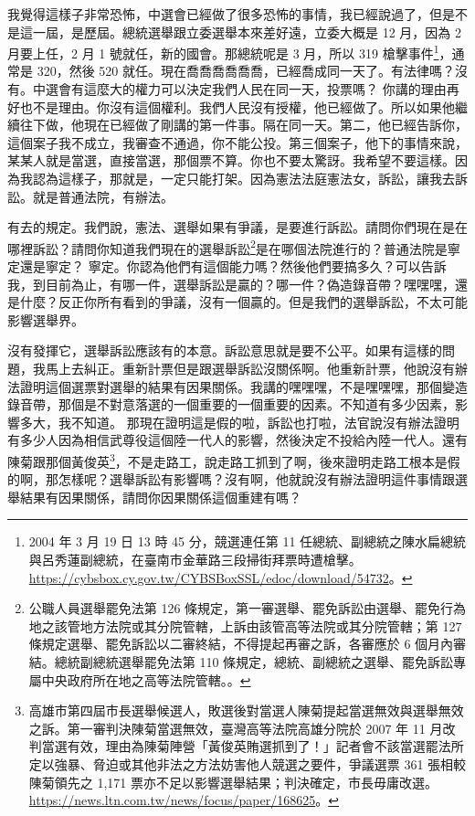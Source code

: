 \hypertarget{w05:cue:345}{}我覺得這樣子非常恐怖，中選會已經做了很多恐怖的事情，我已經說過了，但是不是這一屆，是歷屆。總統選舉跟立委選舉本來差好遠，立委大概是 12 月，因為 2 月要上任，2 月 1 號就任，新的國會。那總統呢是 3 月，所以 319 槍擊事件\footnote{2004 年 3 月 19 日 13 時 45 分，競選連任第 11 任總統、副總統之陳水扁總統與呂秀蓮副總統，在臺南市金華路三段掃街拜票時遭槍擊。\url{https://cybsbox.cy.gov.tw/CYBSBoxSSL/edoc/download/54732}。}，通常是 320，然後 520 就任。現在喬喬喬喬喬喬，已經喬成同一天了。有法律嗎？沒有。中選會有這麼大的權力可以決定我們人民在同一天，投票嗎？
\hypertarget{w05:cue:346}{}你講的理由再好也不是理由。你沒有這個權利。我們人民沒有授權，他已經做了。所以如果他繼續往下做，他現在已經做了剛講的第一件事。隔在同一天。第二，他已經告訴你，這個案子我不成立，我審查不通過，你不能公投。第三個案子，他下的事情來說，某某人就是當選，直接當選，那個票不算。你也不要太驚訝。我希望不要這樣。因為我認為這樣子，那就是，一定只能打架。因為憲法法庭憲法女，訴訟，讓我去訴訟。就是普通法院，有辦法。

\hypertarget{w05:cue:347}{}有去的規定。我們說，憲法、選舉如果有爭議，是要進行訴訟。請問你們現在是在哪裡訴訟？請問你知道我們現在的選舉訴訟\footnote{公職人員選舉罷免法第 126 條規定，第一審選舉、罷免訴訟由選舉、罷免行為地之該管地方法院或其分院管轄，上訴由該管高等法院或其分院管轄；第 127 條規定選舉、罷免訴訟以二審終結，不得提起再審之訴，各審應於 6 個月內審結。總統副總統選舉罷免法第 110 條規定，總統、副總統之選舉、罷免訴訟專屬中央政府所在地之高等法院管轄。\cite{xjbmf}。}是在哪個法院進行的？普通法院是寧定還是寧定？
\hypertarget{w05:cue:348}{}寧定。你認為他們有這個能力嗎？然後他們要搞多久？可以告訴我，到目前為止，有哪一件，選舉訴訟是贏的？哪一件？偽造錄音帶？嘿嘿嘿，還是什麼？反正你所有看到的爭議，沒有一個贏的。但是我們的選舉訴訟，不太可能影響選舉界。

\hypertarget{w05:cue:349}{}沒有發揮它，選舉訴訟應該有的本意。訴訟意思就是要不公平。如果有這樣的問題，我馬上去糾正。重新計票但是跟選舉訴訟沒關係啊。他重新計票，他說沒有辦法證明這個選票對選舉的結果有因果關係。我講的嘿嘿嘿，不是嘿嘿嘿，那個變造錄音帶，那個是不對意落選的一個重要的一個重要的因素。不知道有多少因素，影響多大，我不知道。
\hypertarget{w05:cue:350}{}那現在證明這是假的啦，訴訟也打啦，法官說沒有辦法證明有多少人因為相信武尊役這個陸一代人的影響，然後決定不投給內陸一代人。還有陳菊跟那個黃俊英\footnote{高雄市第四屆市長選舉候選人，敗選後對當選人陳菊提起當選無效與選舉無效之訴。第一審判決陳菊當選無效，臺灣高等法院高雄分院於 2007 年 11 月改判當選有效，理由為陳菊陣營「黃俊英賄選抓到了！」記者會不該當選罷法所定以強暴、脅迫或其他非法之方法妨害他人競選之要件，爭議選票 361 張相較陳菊領先之 1,171 票亦不足以影響選舉結果；判決確定，市長毋庸改選。\url{https://news.ltn.com.tw/news/focus/paper/168625}。}，不是走路工，說走路工抓到了啊，後來證明走路工根本是假的啊，那怎樣呢？選舉訴訟有影響嗎？沒有啊，他就說沒有辦法證明這件事情跟選舉結果有因果關係，請問你因果關係這個重建有嗎？

